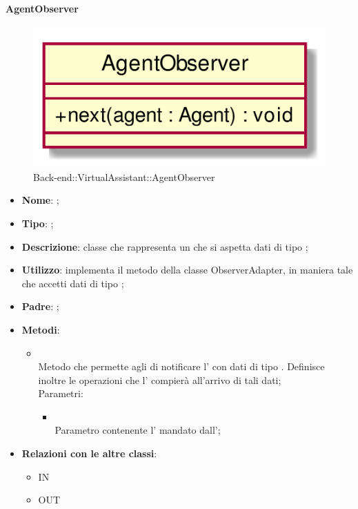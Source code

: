 \hypertarget{AgentObserver_label}{\paragraph{AgentObserver}}
\begin{figure}[h]
	\centering
	\includegraphics[width=\textwidth,height=\textheight,keepaspectratio]{images/ClassAgentObserver.png}
	\caption{Back-end::VirtualAssistant::AgentObserver}
\end{figure}
\begin{itemize}
	\item \textbf{Nome}: ;
	\item \textbf{Tipo}: ;
	\item \textbf{Descrizione}: classe che rappresenta un  che si aspetta dati di tipo ;
	\item \textbf{Utilizzo}: implementa il metodo  della classe ObserverAdapter, in maniera tale che accetti dati di tipo ;
	\item \textbf{Padre}: ;
	\item \textbf{Metodi}:
	\begin{itemize}
		\item[]  \\
		Metodo che permette agli  di notificare l' con dati di tipo . Definisce inoltre le operazioni che l' compierà all'arrivo di tali dati;\\
		Parametri:
		\begin{itemize}
			\item {} \\
			Parametro contenente l' mandato dall';
		\end{itemize}
	\end{itemize}
	\item \textbf{Relazioni con le altre classi}:
	\begin{itemize}
		\item IN \hyperlink{AgentObservable_label}{}
		\item OUT \hyperlink{Agent_label}{}
	\end{itemize}
\end{itemize}
\FloatBarrier

